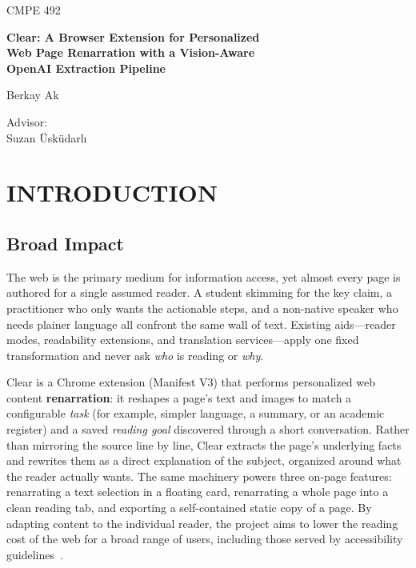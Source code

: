 \documentclass[a4paper,12pt]{report}
\begin{document}
\begin{titlepage}
\centering
\vspace*{0.30\textheight}
{\Large CMPE 492\par}
\vspace{0.7cm}
{\LARGE\bfseries Clear: A Browser Extension for Personalized\\[2pt]
Web Page Renarration with a Vision-Aware\\[2pt]
OpenAI Extraction Pipeline\par}
\vspace{1.6cm}
{\large Berkay Ak\par}
\vspace{1.1cm}
{\large Advisor:\\[4pt] Suzan Üsküdarlı\par}
\vfill
\end{titlepage}

\tableofcontents

\chapter{INTRODUCTION}

\section{Broad Impact}
The web is the primary medium for information access, yet almost every page is
authored for a single assumed reader. A student skimming for the key claim, a
practitioner who only wants the actionable steps, and a non-native speaker who
needs plainer language all confront the same wall of text. Existing aids---reader
modes, readability extensions, and translation services---apply one fixed
transformation and never ask \emph{who} is reading or \emph{why}.

Clear is a Chrome extension (Manifest V3) that performs personalized web content
\textbf{renarration}: it reshapes a page's text and images to match a configurable
\emph{task} (for example, simpler language, a summary, or an academic register)
and a saved \emph{reading goal} discovered through a short conversation. Rather
than mirroring the source line by line, Clear extracts the page's underlying
facts and rewrites them as a direct explanation of the subject, organized around
what the reader actually wants. The same machinery powers three on-page features:
renarrating a text selection in a floating card, renarrating a whole page into a
clean reading tab, and exporting a self-contained static copy of a page. By
adapting content to the individual reader, the project aims to lower the reading
cost of the web for a broad range of users, including those served by
accessibility guidelines~\cite{wcag}.
\end{document}
